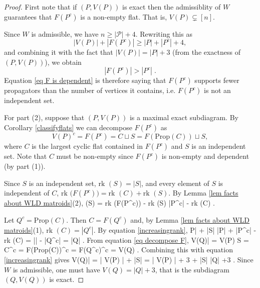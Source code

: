 \documentclass[11pt]{article}
\newcommand{\rk}{\textrm{rk }}
\def\ba #1\ea{\begin{align} #1 \end{align}}
\def\bas #1\eas{\begin{align*} #1 \end{align*}}
\newcommand{\cP}{\mathcal{P}}
\newcommand{\Prop}{\textrm{Prop}}
\theoremstyle{remark}
\theoremstyle{definition}
\begin{document}
\begin{proof}

First note that if $(P,V(P))$ is exact then the admissiblity of $W$ guarantees that $F(P^c)$ is a non-empty flat. That is, $V(P) \subsetneq [n]$.

Since $W$ is admissible, we have $n \geq |\cP| + 4$. Rewriting this as
\[|V(P)| + |F(P^c)|  \geq  |P| + |P^c| +4,\]
and combining it with the fact that $|V(P)| = |P| + 3$ (from the exactness of $(P,V(P))$), we obtain
\begin{equation}\label{eq F is dependent}|F(P^c)| > |P^c| \;.\end{equation}
Equation \eqref{eq F is dependent} is therefore saying that $F(P^c)$ supports fewer propagators than the number of vertices it contains, i.e. $F(P^c)$ is not an independent set.

For part (2), suppose that $(P, V(P))$ is a maximal exact subdiagram. By Corollary \ref{classifyflats} we can decompose $F(P^c)$ as
\begin{equation}\label{eq decompose F}V(P)^c = F(P^c) = C \sqcup S = F(\Prop(C)) \sqcup S,\end{equation}
where $C$ is the largest cyclic flat contained in $F(P^c)$ and $S$ is an  independent set. Note that $C$ must be non-empty since $F(P^c)$ is non-empty and dependent (by part (1)).

Since $S$ is an independent set, $\rk(S) = |S|$, and every element of $S$ is independent of $C$, $\rk\big(F(P^c)\big) = \rk(C) + \rk(S)$. By Lemma \ref{lem facts about WLD matroids}(2), \ba \rk(S) = \rk\big(F(P^c)\big) -  \rk(S) \leq |P^c| - \rk(C) \;. \label{increasingrank} \ea

Let $Q^c = \Prop(C)$. Then $C = F(Q^c)$ and, by Lemma \ref{lem facts about WLD matroids}(1), $\rk(C) = |Q^c|$. By equation \eqref{increasingrank}, \ba |P| + |S| \leq |P| + |P^c| - \rk(C) = |\cP| - |Q^c| = |Q| \;. \label{Qsizebound}\ea From equation \eqref{eq decompose F}, \bas |V(Q)| = V(P) \sqcup S = C^c = F(\Prop(C))^c = F(Q^c)^c = V(Q) \;. \eas Combining this with equation \eqref{increasingrank} gives \ba |V(Q)| = | V(P) | + |S| = | V(P) | + 3 + |S| \leq |Q| +3 \;. \label{Q defines exact}\ea Since $W$ is admissible, one must have $V(Q) = |Q| +3$, that is the subdiagram $(Q, V(Q))$ is exact.


\end{proof}
\end{document}
